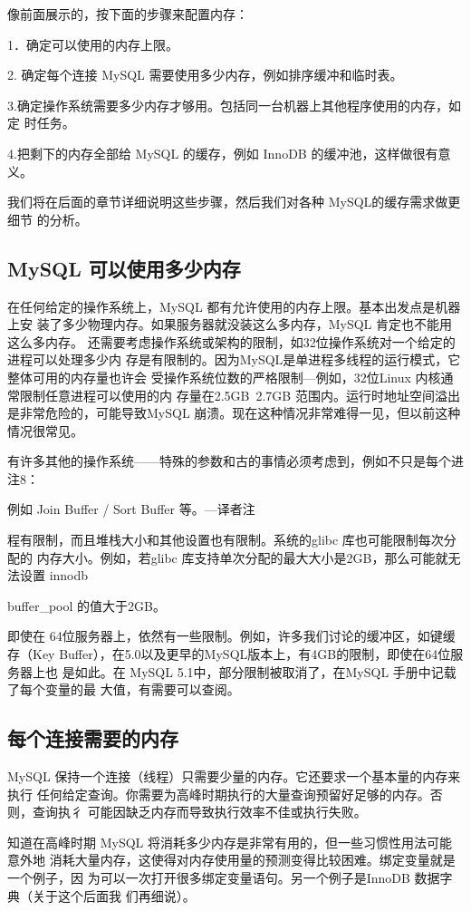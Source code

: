 像前面展示的，按下面的步骤来配置内存：

1．确定可以使用的内存上限。

2. 确定每个连接 MySQL 需要使用多少内存，例如排序缓冲和临时表。

3.确定操作系统需要多少内存才够用。包括同一台机器上其他程序使用的内存，如定
时任务。

4.把剩下的内存全部给 MySQL 的缓存，例如 InnoDB 的缓冲池，这样做很有意义。

我们将在后面的章节详细说明这些步骤，然后我们对各种 MySQL的缓存需求做更细节
的分析。

\subsection{MySQL 可以使用多少内存}
在任何给定的操作系统上，MySQL 都有允许使用的内存上限。基本出发点是机器上安
装了多少物理内存。如果服务器就没装这么多内存，MySQL 肯定也不能用这么多内存。
还需要考虑操作系统或架构的限制，如32位操作系统对一个给定的进程可以处理多少内
存是有限制的。因为MySQL是单进程多线程的运行模式，它整体可用的内存量也许会
受操作系统位数的严格限制—例如，32位Linux 内核通常限制任意进程可以使用的内
存量在2.5GB~2.7GB 范围内。运行时地址空间溢出是非常危险的，可能导致MySQL
崩溃。现在这种情况非常难得一见，但以前这种情况很常见。

有许多其他的操作系统——特殊的参数和古的事情必须考虑到，例如不只是每个进
注8：

例如 Join Buffer / Sort Buffer 等。—译者注

程有限制，而且堆栈大小和其他设置也有限制。系统的glibc 库也可能限制每次分配的
内存大小。例如，若glibc 库支持单次分配的最大大小是2GB，那么可能就无法设置
innodb

buffer\_pool 的值大于2GB。

即使在 64位服务器上，依然有一些限制。例如，许多我们讨论的缓冲区，如键缓存（Key
Buffer），在5.0以及更早的MySQL版本上，有4GB的限制，即使在64位服务器上也
是如此。在 MySQL 5.1中，部分限制被取消了，在MySQL 手册中记载了每个变量的最
大值，有需要可以查阅。

\subsection{每个连接需要的内存}
MySQL 保持一个连接（线程）只需要少量的内存。它还要求一个基本量的内存来执行
任何给定查询。你需要为高峰时期执行的大量查询预留好足够的内存。否则，查询执彳
可能因缺乏内存而导致执行效率不佳或执行失败。

知道在高峰时期 MySQL 将消耗多少内存是非常有用的，但一些习惯性用法可能意外地
消耗大量内存，这使得对内存使用量的预测变得比较困难。绑定变量就是一个例子，因
为可以一次打开很多绑定变量语句。另一个例子是InnoDB 数据字典（关于这个后面我
们再细说）。


